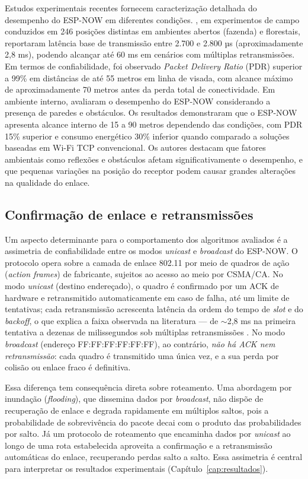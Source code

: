 Estudos experimentais recentes fornecem caracterização detalhada do
desempenho do ESP-NOW em diferentes condições. ,
em experimentos de campo conduzidos em 246 posições distintas em
ambientes abertos (fazenda) e florestais, reportaram latência base de
transmissão entre 2.700 e 2.800 µs (aproximadamente 2,8 ms), podendo
alcançar até 60 ms em cenários com múltiplas retransmissões. Em termos
de confiabilidade, foi observado \emph{Packet Delivery Ratio} (PDR)
superior a 99\% em distâncias de até 55 metros em linha de visada, com
alcance máximo de aproximadamente 70 metros antes da perda total de
conectividade. Em ambiente interno,  avaliaram
o desempenho do ESP-NOW considerando a presença de paredes e obstáculos.
Os resultados demonstraram que o ESP-NOW apresenta alcance interno de 15
a 90 metros dependendo das condições, com PDR 15\% superior e consumo
energético 30\% inferior quando comparado a soluções baseadas em Wi-Fi
TCP convencional. Os autores destacam que fatores ambientais como
reflexões e obstáculos afetam significativamente o desempenho, e que
pequenas variações na posição do receptor podem causar grandes
alterações na qualidade do enlace.

\subsection{Confirmação de enlace e retransmissões}\label{confirmacao-de-enlace}

Um aspecto determinante para o comportamento dos algoritmos avaliados é a
assimetria de confiabilidade entre os modos \emph{unicast} e
\emph{broadcast} do ESP-NOW. O protocolo opera sobre a camada de enlace
802.11 por meio de quadros de ação (\emph{action frames}) de fabricante,
sujeitos ao acesso ao meio por CSMA/CA. No modo \emph{unicast} (destino
endereçado), o quadro é confirmado por um ACK de hardware e
retransmitido automaticamente em caso de falha, até um limite de
tentativas; cada retransmissão acrescenta latência da ordem do tempo de
\emph{slot} e do \emph{backoff}, o que explica a faixa observada na
literatura --- de $\sim$2,8 ms na primeira tentativa a dezenas de
milissegundos sob múltiplas retransmissões \cite{becker2025}. No modo
\emph{broadcast} (endereço FF:FF:FF:FF:FF:FF), ao contrário, \emph{não há
ACK nem retransmissão}: cada quadro é transmitido uma única vez, e a sua
perda por colisão ou enlace fraco é definitiva.

Essa diferença tem consequência direta sobre roteamento. Uma abordagem por
inundação (\emph{flooding}), que dissemina dados por \emph{broadcast}, não
dispõe de recuperação de enlace e degrada rapidamente em múltiplos saltos,
pois a probabilidade de sobrevivência do pacote decai com o produto das
probabilidades por salto. Já um protocolo de roteamento que encaminha
dados por \emph{unicast} ao longo de uma rota estabelecida aproveita a
confirmação e a retransmissão automáticas do enlace, recuperando perdas
salto a salto. Essa assimetria é central para interpretar os resultados
experimentais (Capítulo~\ref{cap:resultados}).

